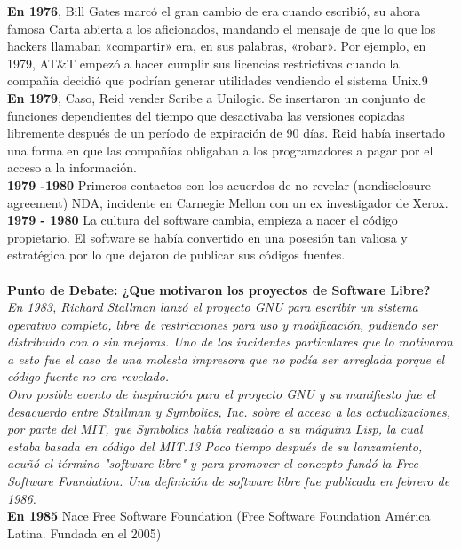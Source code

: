 {\bf En 1976}, Bill Gates marcó el gran cambio de era cuando escribió, su ahora famosa Carta abierta a los aficionados, mandando el mensaje de que lo que los hackers llamaban «compartir» era, en sus palabras, «robar». Por ejemplo, en 1979, AT\&T empezó a hacer cumplir sus licencias restrictivas cuando la compañía decidió que podrían generar utilidades vendiendo el sistema Unix.9
\\
{\bf En 1979}, Caso, Reid vender Scribe a Unilogic. Se insertaron un conjunto de funciones dependientes del tiempo que desactivaba las versiones copiadas libremente después de un período de expiración de 90 días.
Reid había insertado una forma en que las compañías obligaban a los programadores a pagar por el acceso a la información.
\\
{\bf 1979 -1980} Primeros contactos con los acuerdos de no revelar (nondisclosure agreement) NDA, incidente en Carnegie Mellon con un ex investigador de Xerox.
\\
{\bf 1979 - 1980} La cultura del software cambia, empieza a nacer el código propietario.
El software se había convertido en una posesión tan valiosa y estratégica por lo que dejaron de publicar sus códigos fuentes.
\\
\\
{\bf Punto de Debate: ¿Que motivaron los proyectos de Software Libre?}
{\it 
\\
En 1983, Richard Stallman lanzó el proyecto GNU para escribir un sistema operativo completo, libre de restricciones para uso y modificación, pudiendo ser distribuido con o sin mejoras. Uno de los incidentes particulares que lo motivaron a esto fue el caso de una molesta impresora que no podía ser arreglada porque el código fuente no era revelado.
\\
Otro posible evento de inspiración para el proyecto GNU y su manifiesto fue el desacuerdo entre Stallman y Symbolics, Inc. sobre el acceso a las actualizaciones, por parte del MIT, que Symbolics había realizado a su máquina Lisp, la cual estaba basada en código del MIT.13 Poco tiempo después de su lanzamiento, acuñó el término "software libre" y para promover el concepto fundó la Free Software Foundation.
Una definición de software libre fue publicada en febrero de 1986.
}
\\
{\bf En 1985} Nace Free Software Foundation (Free Software Foundation América Latina. Fundada en el 2005)

